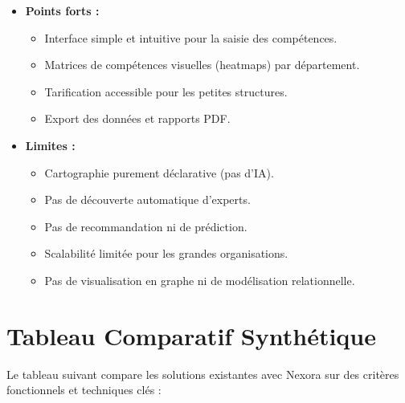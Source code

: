 \documentclass[12pt,a4paper]{article}
\begin{document}
\begin{itemize}[leftmargin=*]
    \item \textbf{Points forts :}
    \begin{itemize}[leftmargin=*, label=--]
        \item Interface simple et intuitive pour la saisie des compétences.
        \item Matrices de compétences visuelles (heatmaps) par département.
        \item Tarification accessible pour les petites structures.
        \item Export des données et rapports PDF.
    \end{itemize}
    \item \textbf{Limites :}
    \begin{itemize}[leftmargin=*, label=--]
        \item Cartographie purement déclarative (pas d'IA).
        \item Pas de découverte automatique d'experts.
        \item Pas de recommandation ni de prédiction.
        \item Scalabilité limitée pour les grandes organisations.
        \item Pas de visualisation en graphe ni de modélisation relationnelle.
    \end{itemize}
\end{itemize}

\section{Tableau Comparatif Synthétique}

Le tableau suivant compare les solutions existantes avec Nexora sur des critères fonctionnels et techniques clés :
\end{document}
